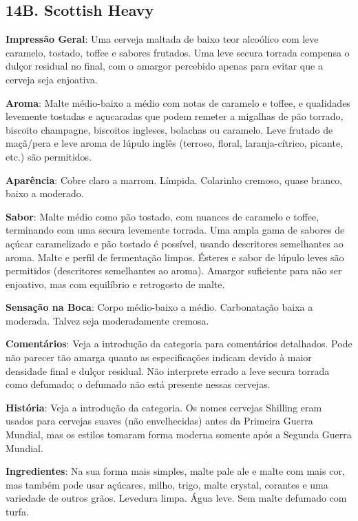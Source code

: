 \subsection*{14B. Scottish Heavy}
\textbf{Impressão Geral}: Uma cerveja maltada de baixo teor alcoólico com leve caramelo, tostado, toffee e sabores frutados. Uma leve secura torrada compensa o dulçor residual no final, com o amargor percebido apenas para evitar que a cerveja seja enjoativa.

\textbf{Aroma}: Malte médio-baixo a médio com notas de caramelo e toffee, e qualidades levemente tostadas e açucaradas que podem remeter a migalhas de pão torrado, biscoito champagne, biscoitos ingleses, bolachas ou caramelo. Leve frutado de maçã/pera e leve aroma de lúpulo inglês (terroso, floral, laranja-cítrico, picante, etc.) são permitidos.

\textbf{Aparência}: Cobre claro a marrom. Límpida. Colarinho cremoso, quase branco, baixo a moderado.

\textbf{Sabor}: Malte médio como pão tostado, com nuances de caramelo e toffee, terminando com uma secura levemente torrada. Uma ampla gama de sabores de açúcar caramelizado e pão tostado é possível, usando descritores semelhantes ao aroma. Malte e perfil de fermentação limpos. Ésteres e sabor de lúpulo leves são permitidos (descritores semelhantes ao aroma). Amargor suficiente para não ser enjoativo, mas com equilíbrio e retrogosto de malte.

\textbf{Sensação na Boca}: Corpo médio-baixo a médio. Carbonatação baixa a moderada. Talvez seja moderadamente cremosa.

\textbf{Comentários}: Veja a introdução da categoria para comentários detalhados. Pode não parecer tão amarga quanto as especificações indicam devido à maior densidade final e dulçor residual. Não interprete errado a leve secura torrada como defumado; o defumado não está presente nessas cervejas.

\textbf{História}: Veja a introdução da categoria. Os nomes cervejas Shilling eram usados para cervejas suaves (não envelhecidas) antes da Primeira Guerra Mundial, mas os estilos tomaram forma moderna somente após a Segunda Guerra Mundial.

\textbf{Ingredientes}: Na sua forma mais simples, malte pale ale e malte com mais cor, mas também pode usar açúcares, milho, trigo, malte crystal, corantes e uma variedade de outros grãos. Levedura limpa. Água leve. Sem malte defumado com turfa.


